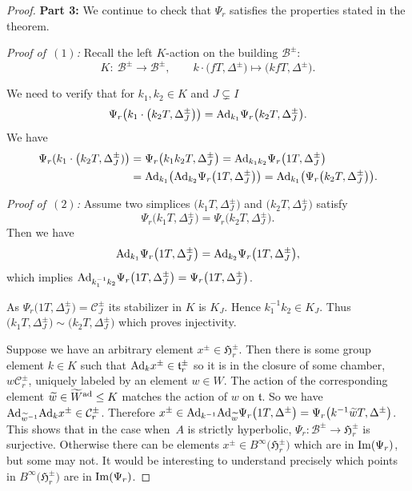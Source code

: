 \documentclass[pdftex]{sigma}
\numberwithin{equation}{section}
\def\wtil{\widetilde w}
\def\Wtil{\widetilde W}
\def\cB{\mathcal B}
\def\cC{\mathcal C}
\def\fH{\mathfrak{H}}
\def\ft{\mathfrak{t}}
\begin{document}
\begin{proof}
{\bf Part 3:} We continue to check that $\Psi_r$ satisfies the properties stated in the theorem.

{\em Proof of~$(1)$:} Recall the left $K$-action on the building $\cB^\pm$:
\begin{displaymath}
K\colon \ \cB^\pm \longrightarrow \cB^\pm,\qquad k\cdot \big(fT, \Delta^\pm\big)\mapsto \big(kfT, \Delta^\pm\big).
\end{displaymath}

We need to verify that for $k_1,k_2\in K$ and $J\subsetneq I$
\[\Psi_r\big( k_1 \cdot\big(k_2T, \Delta^\pm_J\big)\big)={\rm Ad}_{k_1} \Psi_r\big(k_2 T, \Delta^\pm_J\big).\]
We have
\begin{align*}
\Psi_r (k_1\cdot \big(k_2 T, \Delta^\pm_J)\big)&=\Psi_r\big(k_1k_2T, \Delta^\pm_J\big)={\rm Ad}_{k_1k_2} \Psi_r\big(1 T, \Delta^\pm_J\big) \\
&={\rm Ad}_{k_1} \big({\rm Ad}_{k_2} \Psi_r\big(1 T,\Delta^\pm_J\big)\big)= {\rm Ad}_{k_1}\big(\Psi_r\big(k_2T, \Delta^\pm_J\big)\big).
\end{align*}

{\it Proof of~$(2)$:}
Assume two simplices $\big(k_1T, \Delta_J^\pm\big)$ and $\big(k_2T, \Delta_J^\pm\big)$ satisfy
\[\Psi_r\big(k_1T, \Delta_J^\pm\big)=\Psi_r\big(k_2T, \Delta_J^\pm\big).\]
Then we have
\[{\rm Ad}_{k_1} \Psi_r\big(1T, \Delta_J^\pm\big)={\rm Ad}_{k_2} \Psi_r\big(1T, \Delta_J^\pm\big),\]
which implies ${\rm Ad}_{k_1^{-1}k_2}\Psi_r\big(1T, \Delta_J^\pm\big)=\Psi_r\big(1T, \Delta_J^\pm\big)$.

As $\Psi_r\big(1T, \Delta_J^\pm\big)=\cC^\pm_J$ its stabilizer in $K$ is $K_J$. Hence $k_1^{-1}k_2\in K_J$.
Thus $\big(k_1T, \Delta_J^\pm\big)\sim\big(k_2T, \Delta_J^\pm\big)$ which proves injectivity.

Suppose we have an arbitrary element $x^\pm\in\fH_r^\pm$. Then there is some group element $k\in K$ such that
${\rm Ad}_k x^\pm\in \ft^\pm_r$ so it is in the closure of some chamber, $w\cC_r^\pm$, uniquely labeled by an element $w\in W$.
The action of the corresponding element $\wtil\in\Wtil^{\rm ad}\leq K$ matches the action of $w$ on $\ft$. So we have
${\rm Ad}_{\wtil^{-1}} {\rm Ad}_k x^\pm\in \cC^\pm_r$. Therefore
$x^\pm\in {\rm Ad}_{k^{-1}} {\rm Ad}_{\wtil} \Psi_r\big(1T, \Delta^\pm\big)=\Psi_r\big(k^{-1} \wtil T, \Delta^\pm\big)$.
This shows that in the case when~$A$ is strictly hyperbolic, $\Psi_r\colon \cB^\pm\to \fH_r^\pm$ is surjective. Otherwise there can be elements
$x^\pm\in B^\infty\big(\fH_r^\pm\big)$ which are in ${\rm Im}(\Psi_r)$, but some may not. It would be interesting to understand precisely which points in $B^\infty\big(\fH_r^\pm\big)$ are in ${\rm Im}(\Psi_r)$.


\end{proof}
\end{document}
